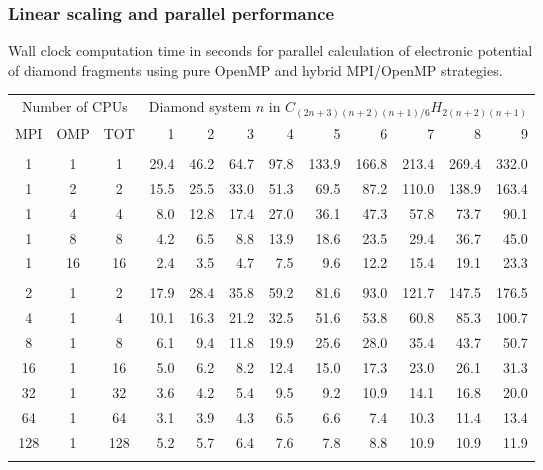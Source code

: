 \begin{frame}
    \frametitle{Linear scaling and parallel performance}
    \centering
    Wall clock computation time in seconds for parallel calculation of electronic potential\\
    of diamond fragments using pure OpenMP and hybrid MPI/OpenMP strategies.\\
    \begin{table}
    \tiny
    \begin{tabular}{cccrrrrrrrrr}
	\hline
	\hline                                                                           
	\multicolumn{3}{c}{Number of CPUs}&
	\multicolumn{9}{c}{Diamond system $n$ in $C_{(2n+3)(n+2)(n+1)/6}H_{2(n+2)(n+1)}$}\\
	MPI&OMP&TOT	&1	&2	&3	&4	&5	&6	&7	&8	&9	\\
	\hline
	   &   &   	&	&      	&	&	&	&	&	&	&	\\
	  1&  1&  1	& 29.4	& 46.2 	& 64.7 	& 97.8  &133.9  &166.8  &213.4  &269.4  &332.0  \\
	  1&  2&  2	& 15.5	& 25.5 	& 33.0 	& 51.3  & 69.5  & 87.2  &110.0  &138.9  &163.4  \\
	  1&  4&  4	&  8.0 	& 12.8 	& 17.4 	& 27.0  & 36.1  & 47.3  & 57.8  & 73.7  & 90.1  \\
	  1&  8&  8	&  4.2 	&  6.5 	&  8.8 	& 13.9  & 18.6  & 23.5  & 29.4  & 36.7  & 45.0  \\
	  1& 16& 16	&  2.4 	&  3.5 	&  4.7 	&  7.5  &  9.6  & 12.2  & 15.4  & 19.1  & 23.3  \\
	   &   &   	&      	&      	&    	&    	&    	&	&	&	&	\\
	  2&  1&  2	& 17.9 	& 28.4 	& 35.8 	& 59.2  & 81.6  & 93.0  &121.7  &147.5  &176.5  \\
	  4&  1&  4	& 10.1 	& 16.3 	& 21.2 	& 32.5  & 51.6  & 53.8  & 60.8  & 85.3  &100.7  \\
	  8&  1&  8	&  6.1 	&  9.4 	& 11.8 	& 19.9  & 25.6  & 28.0  & 35.4  & 43.7  & 50.7  \\
	 16&  1& 16	&  5.0 	&  6.2 	&  8.2 	& 12.4  & 15.0  & 17.3  & 23.0  & 26.1  & 31.3  \\
	 32&  1& 32	&  3.6 	&  4.2 	&  5.4 	&  9.5  &  9.2  & 10.9  & 14.1  & 16.8  & 20.0  \\
	 64&  1& 64	&  3.1 	&  3.9 	&  4.3 	&  6.5  &  6.6  &  7.4  & 10.3  & 11.4  & 13.4  \\
	128&  1&128	&  5.2 	&  5.7 	&  6.4 	&  7.6  &  7.8  &  8.8  & 10.9  & 10.9  & 11.9  \\
	   &   &   	&      	&      	&      	& 	& 	& 	& 	& 	&	\\

\end{tabular}
\end{table}
\end{frame}
